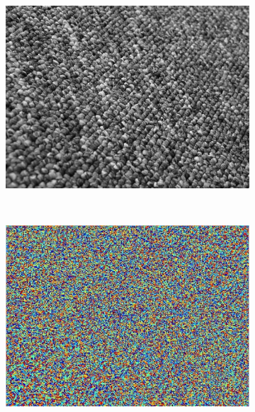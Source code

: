 \documentclass[10pt,twocolumn,letterpaper]{article}
\begin{document}
\begin{figure}
    \centering
    \begin{subfigure}[b]{0.2\textwidth}
        \includegraphics[width=\textwidth]{T18_01.jpg}
    \end{subfigure}
    ~ 
    \begin{subfigure}[b]{0.2\textwidth}
        \includegraphics[width=\textwidth]{T18_D01.eps}
    \end{subfigure}
    ~ 
    \begin{subfigure}[b]{0.2\textwidth}

\end{subfigure}
\end{figure}
\end{document}
